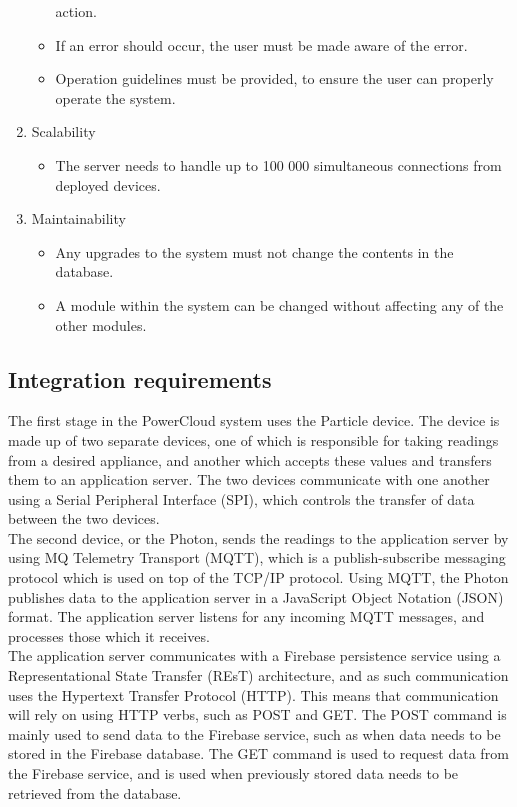 \documentclass{article}
\begin{document}
\begin{enumerate}
\begin{itemize}
				action.
				\item If an error should occur, the user must be made 
				aware of the error.
				\item Operation guidelines must be provided, to ensure 
				the user can properly operate the system.
			\end{itemize}
		\item Scalability
			\begin{itemize}
				\item The server needs to handle up to 100 000 
				simultaneous connections from deployed devices.
			\end{itemize}
		\item Maintainability
			\begin{itemize}
				\item Any upgrades to the system must not change the 
				contents in the database.
				\item A module within the system can be changed without 
				affecting any of the other modules.
			\end{itemize}
	\end{enumerate}
	
	\newpage
	
	\subsection{Integration requirements}
	
	The first stage in the PowerCloud system uses the Particle device. 
	The device is made up of two separate devices, one of which is 
	responsible for taking readings from a desired appliance, and another 
	which accepts these values and transfers them to an application 
	server. The two devices communicate with one another using a Serial 
	Peripheral Interface (SPI), which controls the transfer of data 
	between the two devices.\\
	
	The second device, or the Photon, sends the readings to the 
	application server by using MQ Telemetry Transport (MQTT), which is a 
	publish-subscribe messaging protocol which is used on top of the 
	TCP/IP protocol. Using MQTT, the Photon publishes data to the 
	application server in a JavaScript Object Notation (JSON) format. The 
	application server listens for any incoming MQTT messages, and 
	processes those which it receives.\\
	
	The application server communicates with a Firebase persistence 
	service using a Representational State Transfer (REsT) architecture, 
	and as such communication uses the Hypertext Transfer Protocol 
	(HTTP). This means that communication will rely on using HTTP verbs, 
	such as POST and GET. The POST command is mainly used to send data to 
	the Firebase service, such as when data needs to be stored in the 
	Firebase database. The GET command is used to request data from the 
	Firebase service, and is used when previously stored data needs to be 
	retrieved from the database.\\
	
\end{document}
